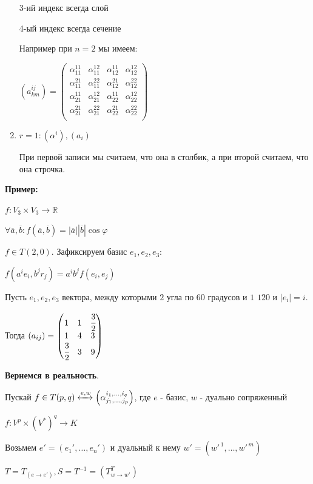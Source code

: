 \begin{enumerate}
3-ий индекс всегда слой

4-ый индекс всегда сечение

Например при $n=2$ мы имеем:

$(a^{ij}_{km}) = \left(
\begin{array}{cc|cc}
  \alpha^{11}_{11} & \alpha^{12}_{11} & \alpha^{11}_{12} & \alpha^{12}_{12} \\
  \alpha^{21}_{11} & \alpha^{22}_{11} & \alpha^{21}_{12} & \alpha^{22}_{12} \\
\hline
  \alpha^{11}_{21} & \alpha^{12}_{21} & \alpha^{11}_{22} & \alpha^{12}_{22} \\
  \alpha^{21}_{21} & \alpha^{22}_{21} & \alpha^{21}_{22} & \alpha^{22}_{22} \\
\end{array}
\right)$


\item $r=1: (\alpha^i), (a_i)$

При первой записи мы считаем, что она в столбик, а при второй считаем, что она строчка.

\end{enumerate}


\textbf{Пример:}

$f:V_3\times V_3 \rightarrow \mathbb{R}$

$\forall \overline{a}, \overline{b}: f(\overline{a},\overline{b}) = |\overline{a}||\overline{b}|\cos \varphi$

$f\in T(2,0)$. Зафиксируем базис $e_1,e_2,e_3$:

$f(a^ie_i,b^jr_j) = a^ib^j f(e_i,e_j)$

Пусть $e_1,e_2,e_3$ вектора, между которыми $2$ угла по $60$ градусов и $1$ $120$  и $|e_i|=i$.

Тогда $(a_{ij})= \begin{pmatrix}
    1 & 1 & \cfrac{3}{2} \\
    1 & 4& 3 \\
    \cfrac{3}{2} & 3 & 9
\end{pmatrix}$


\textbf{Вернемся в реальность}.

Пускай $f \in T(p,q) \xleftrightarrow{e,w} \left(\alpha^{i_1,\ldots,i_q}_{j_1,\ldots,j_p}\right)$, где $e$ - базис, $w$ - дуально сопряженный

$f: V^p \times (V^*)^q\rightarrow K$

Возьмем $e' = (e_1',\ldots,e_n' )$ и дуальный к нему $w'=(w'^{\,1},\ldots, w'^{\,m})$

$T = T_{(e\rightarrow e')}, S = T^{-1} = (T_{w\to w'}^T)$

